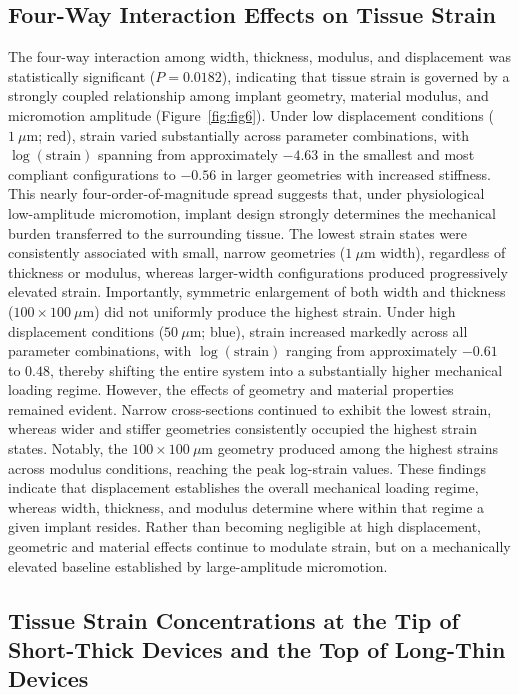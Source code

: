 \documentclass[fleqn,10pt]{wlscirep}
\begin{document}
\subsection{Four-Way Interaction Effects on Tissue Strain}

The four-way interaction among width, thickness, modulus, and displacement was statistically significant ($P = 0.0182$), indicating that tissue strain is governed by a strongly coupled relationship among implant geometry, material modulus, and micromotion amplitude (Figure~\ref{fig:fig6}). Under low displacement conditions ($1~\mu\mathrm{m}$; red), strain varied substantially across parameter combinations, with $\log(\mathrm{strain})$ spanning from approximately $-4.63$ in the smallest and most compliant configurations to $-0.56$ in larger geometries with increased stiffness. This nearly four-order-of-magnitude spread suggests that, under physiological low-amplitude micromotion, implant design strongly determines the mechanical burden transferred to the surrounding tissue. The lowest strain states were consistently associated with small, narrow geometries ($1~\mu\mathrm{m}$ width), regardless of thickness or modulus, whereas larger-width configurations produced progressively elevated strain. Importantly, symmetric enlargement of both width and thickness ($100 \times 100~\mu\mathrm{m}$) did not uniformly produce the highest strain. Under high displacement conditions ($50~\mu\mathrm{m}$; blue), strain increased markedly across all parameter combinations, with $\log(\mathrm{strain})$ ranging from approximately $-0.61$ to $0.48$, thereby shifting the entire system into a substantially higher mechanical loading regime. However, the effects of geometry and material properties remained evident. Narrow cross-sections continued to exhibit the lowest strain, whereas wider and stiffer geometries consistently occupied the highest strain states. Notably, the $100 \times 100~\mu\mathrm{m}$ geometry produced among the highest strains across modulus conditions, reaching the peak log-strain values. These findings indicate that displacement establishes the overall mechanical loading regime, whereas width, thickness, and modulus determine where within that regime a given implant resides. Rather than becoming negligible at high displacement, geometric and material effects continue to modulate strain, but on a mechanically elevated baseline established by large-amplitude micromotion.


\subsection{Tissue Strain Concentrations at the Tip of Short-Thick Devices and the Top of Long-Thin Devices}
\end{document}
